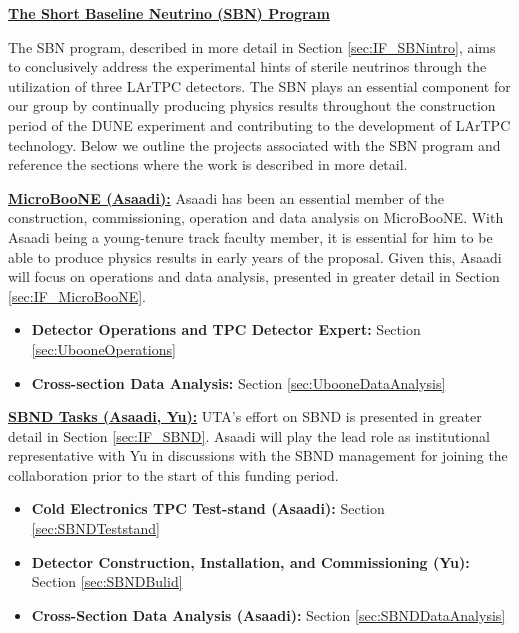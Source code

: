 \noindent \underline{\textbf{The Short Baseline Neutrino (SBN) Program}}

\noindent The SBN program, described in more detail in Section \ref{sec:IF_SBNintro}, aims to conclusively address the experimental hints of sterile neutrinos through the utilization of three LArTPC detectors. The SBN plays an essential component for our group by continually producing physics results throughout the construction period of the DUNE experiment and contributing to the development of LArTPC technology. Below we outline the projects associated with the SBN program and reference the sections where the work is described in more detail.

\noindent \underline{\textbf{MicroBooNE (Asaadi):}} Asaadi has been an essential member of the construction, commissioning, operation and data analysis on MicroBooNE. With Asaadi being a young-tenure track faculty member, it is essential for him to be able to produce physics results in early years of the proposal. Given this, Asaadi will focus on operations and data analysis, presented in greater detail in Section \ref{sec:IF_MicroBooNE}.
\begin{itemize}[noitemsep,nolistsep]
\item{\textbf{Detector Operations and TPC Detector Expert:}} Section \ref{sec:UbooneOperations}
\item{\textbf{Cross-section Data Analysis:}} Section \ref{sec:UbooneDataAnalysis}
\end{itemize}

\noindent \underline{\textbf{SBND Tasks (Asaadi, Yu):}}  UTA's effort on SBND is presented in greater detail in Section \ref{sec:IF_SBND}. Asaadi will play the lead role as institutional representative with Yu in discussions with the SBND management for joining the collaboration prior to the start of this funding period.
\begin{itemize}[noitemsep,nolistsep]
\item{\textbf{Cold Electronics TPC Test-stand (Asaadi):}} Section \ref{sec:SBNDTeststand}
\item{\textbf{Detector Construction, Installation, and Commissioning (Yu):}} Section \ref{sec:SBNDBulid}
\item{\textbf{Cross-Section Data Analysis (Asaadi):}} Section \ref{sec:SBNDDataAnalysis}
\end{itemize}

